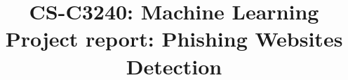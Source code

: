 \documentclass{article}
\title{CS-C3240: Machine Learning\\
    \large Project report: Phishing Websites Detection}
\newcommand{\inlinemaketitle}{{\let\newpage\relax\maketitle}}
\begin{document}
\inlinemaketitle
\tableofcontents


% 
% 







\printbibliography[heading=bibintoc]

\newpage
\begin{appendices}
    
\end{appendices}
\end{document}
